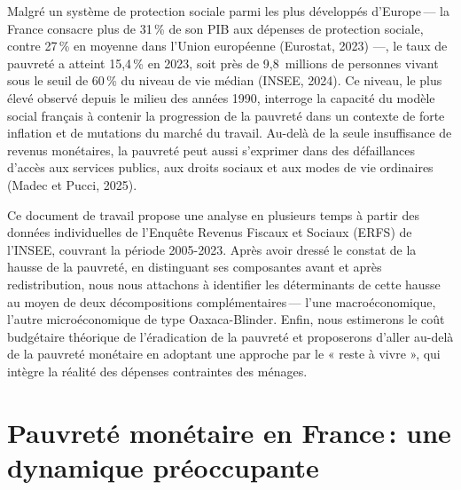 \documentclass[
  french,
  9pt,
  a4paper,
]{article}
\renewcommand*\contentsname{Table des matières}
\newcommand\contentsname{Table des matières}
\begin{document}

\vspace{2.5cm}

\renewcommand*\contentsname{Table des matières}
{
\hypersetup{linkcolor=}
\setcounter{tocdepth}{1}
\tableofcontents
}

\vspace{5cm}
Malgré un système de protection sociale parmi les plus développés
d'Europe\,--- la France consacre plus de 31\,\% de son PIB aux dépenses
de protection sociale, contre 27\,\% en moyenne dans l'Union européenne
(Eurostat, 2023) ---, le taux de pauvreté a atteint 15,4\,\% en 2023,
soit près de 9,8~millions de personnes vivant sous le seuil de 60\,\% du
niveau de vie médian (INSEE, 2024). Ce niveau, le plus élevé observé
depuis le milieu des années 1990, interroge la capacité du modèle social
français à contenir la progression de la pauvreté dans un contexte de
forte inflation et de mutations du marché du travail. Au-delà de la
seule insuffisance de revenus monétaires, la pauvreté peut aussi
s'exprimer dans des défaillances d'accès aux services publics, aux
droits sociaux et aux modes de vie ordinaires (Madec et Pucci, 2025).

Ce document de travail propose une analyse en plusieurs temps à partir
des données individuelles de l'Enquête Revenus Fiscaux et Sociaux (ERFS)
de l'INSEE, couvrant la période 2005-2023. Après avoir dressé le constat
de la hausse de la pauvreté, en distinguant ses composantes avant et
après redistribution, nous nous attachons à identifier les déterminants
de cette hausse au moyen de deux décompositions complémentaires\,---
l'une macroéconomique, l'autre microéconomique de type Oaxaca-Blinder.
Enfin, nous estimerons le coût budgétaire théorique de l'éradication de
la pauvreté et proposerons d'aller au-delà de la pauvreté monétaire en
adoptant une approche par le « reste à vivre », qui intègre la réalité
des dépenses contraintes des ménages.

\section{Pauvreté monétaire en France\,: une dynamique
préoccupante}\label{pauvretuxe9-monuxe9taire-en-france-une-dynamique-pruxe9occupante}
\end{document}
